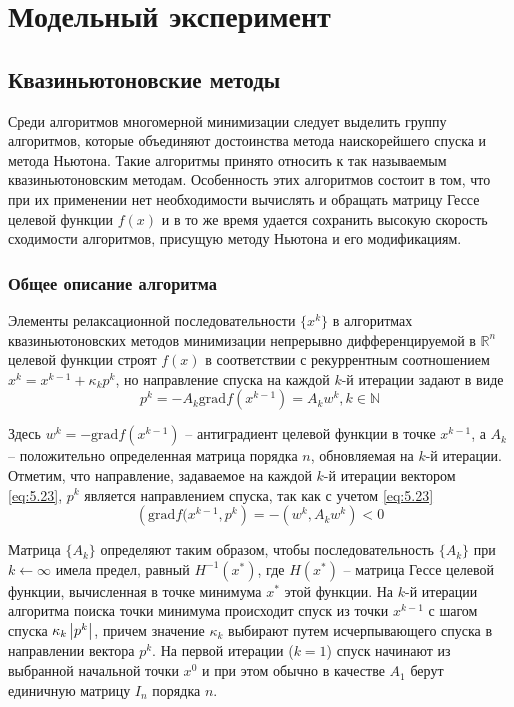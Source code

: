 \chapter{Модельный эксперимент}

\section{Квазиньютоновские методы}

Среди алгоритмов многомерной минимизации следует выделить группу алгоритмов, 
которые объединяют достоинства метода наискорейшего спуска и метода Ньютона. 
Такие алгоритмы принято относить к так называемым квазиньютоновским методам. 
Особенность этих алгоритмов состоит в том, что при их применении нет 
необходимости вычислять и обращать матрицу Гессе целевой функции \( f(x) \) 
и в то же время удается сохранить высокую скорость сходимости алгоритмов, 
присущую методу Ньютона и его модификациям.

\subsection{Общее описание алгоритма}

\newcommand{\grad}{\mathrm{grad}}

Элементы релаксационной последовательности \( \{ x^k \} \) в алгоритмах 
квазиньютоновских методов минимизации непрерывно дифференцируемой в 
\( \mathbb{R}^n \) целевой функции строят \( f(x) \) в соответствии с 
рекуррентным соотношением \( x^k = x^{k-1} + \kappa_k p^k \), но направление 
спуска на каждой \( k \)-й итерации задают в виде
\begin{equation}
    p^k = -A_k \grad f(x^{k-1}) = A_k w^k, k \in \mathbb{N}
    \label{eq:5.23}
\end{equation}

Здесь \( w^k = -\grad f(x^{k-1}) \) -- антиградиент целевой функции в точке 
\( x^{k-1} \), а \( A_k \) -- положительно определенная матрица порядка 
\( n \), обновляемая на \( k \)-й итерации. Отметим, что направление, 
задаваемое на каждой \( k \)-й итерации вектором \eqref{eq:5.23}, \( p^k \) 
является направлением спуска, так как с учетом \eqref{eq:5.23}
\begin{equation}
    \left( \grad f(x^{k-1}, p^k \right) = -\left( w^k, A_k w^k \right) < 0
\end{equation}

Матрица \( \{ A_k \} \) определяют таким образом, чтобы последовательность 
\( \{ A_k \} \) при \( k \leftarrow \infty \) имела предел, равный 
\( H^{-1}(x^*) \), где \( H(x^*) \) -- матрица Гессе целевой функции, 
вычисленная в точке минимума \( x^* \) этой функции. На \( k \)-й итерации 
алгоритма поиска точки минимума происходит спуск из точки \( x^{k-1} \) с 
шагом спуска \( \kappa_k \left| p^k \right| \), причем значение \( \kappa_k \) выбирают 
путем исчерпывающего спуска в направлении вектора \( p^k \). На первой 
итерации (\( k = 1 \)) спуск начинают из выбранной начальной точки \( x^0 \) и 
при этом обычно в качестве \( A_1 \) берут единичную матрицу \( I_n \) порядка 
\( n \). 


